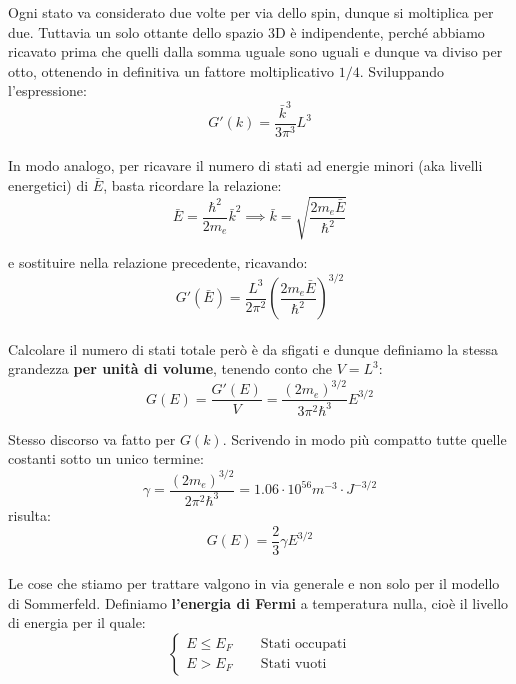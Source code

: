 \documentclass{book}
\begin{document}
                    Ogni stato va considerato due volte per via dello spin, dunque si moltiplica per due. Tuttavia un solo ottante dello spazio 3D è indipendente, perché abbiamo ricavato prima che quelli dalla somma uguale sono uguali e dunque va diviso per otto, ottenendo in definitiva un fattore moltiplicativo $1/4$. Sviluppando l'espressione:
                    $$G'(k) = \frac{\bar{k}^{3}}{3 \pi^{3}}L^{3}$$
            \paragraph{}
                In modo analogo, per ricavare il numero di stati ad energie minori (aka livelli energetici) di $\bar{E}$, basta ricordare la relazione:
                $$\bar{E} = \frac{\hbar ^{2}}{2m_{e}}\bar{k}^{2} \implies \bar{k} =\sqrt{ \frac{2m_{e}\bar{E}}{\hbar ^{2}}}$$

                e sostituire nella relazione precedente, ricavando:
                $$G'(\bar{E}) = \frac{L^{3}}{2 \pi ^{2}} (\frac{2m_{e}\bar{E}}{\hbar ^{2}}) ^{3/2}$$

            \paragraph{}
                Calcolare il numero di stati totale però è da sfigati e dunque definiamo la stessa grandezza \textbf{per unità di volume}, tenendo conto che $V=L^{3}$:
                $$G(E) = \frac{G'(E)}{V} = \frac{(2m_{e}) ^{3/2}}{3 \pi^{2}\hbar^{3}} E^{3/2}$$

                Stesso discorso va fatto per $G(k)$. Scrivendo in modo più compatto tutte quelle costanti sotto un unico termine:
                $$\gamma = \frac{(2m_{e})^{3/2}}{2 \pi^{2} \hbar ^{3}} = 1.06 \cdot 10^{56} m^{-3} \cdot J^{-3/2}$$
                risulta:
                $$G(E) = \frac{2}{3} \gamma E^{3/2}$$

            \paragraph{}
                Le cose che stiamo per trattare valgono in via generale e non solo per il modello di Sommerfeld. Definiamo \textbf{l'energia di Fermi} a temperatura nulla, cioè il livello di energia per il quale:
                $$\begin{cases}
                    E \leq E_{F} \quad \quad \textrm{Stati occupati} \\
                    E> E_{F} \quad \quad \textrm{Stati vuoti}
                \end{cases}$$
                
\end{document}
